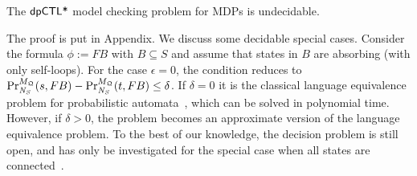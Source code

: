 \begin{theorem}\label{theorem:mdp-model-checking}
The $\dpCTLstar$ model checking problem for MDPs  is undecidable.
\end{theorem}

The proof is put in Appendix. We discuss some decidable special cases. Consider the formula $\phi:=F B$ with $B\subseteq S$ and assume that states in $B$ are absorbing (with only self-loops). For the case $\epsilon=0$, the condition reduces to
$\myPr{s}{M_{\scheduler{Q}}}{\neighbor{S}}{F B} -
\myPr{t}{M_{\scheduler{Q}}}{\neighbor{S}}{F B}\le \delta$. If $\delta=0$ it is the classical language equivalence problem for probabilistic automata~\cite{Rabin63}, which can be solved in polynomial time. However, if $\delta>0$, the problem
becomes an approximate version of the language equivalence problem. To the best of our knowledge, the decision problem is still open, and has only be investigated for the special case when all states are connected~\cite{Tzeng92}.




